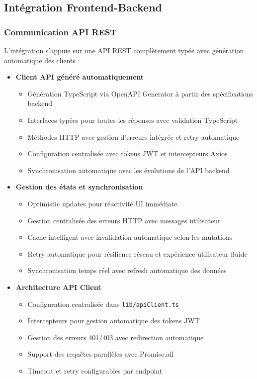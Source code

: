 \documentclass[12pt,a4paper]{report}
\begin{document}
\subsection{Intégration Frontend-Backend}

\subsubsection{Communication API REST}

L'intégration s'appuie sur une API REST complètement typée avec génération automatique des clients :

\begin{itemize}
\item \textbf{Client API généré automatiquement}
  \begin{itemize}

  \item Génération TypeScript via OpenAPI Generator à partir des spécifications backend
  \item Interfaces typées pour toutes les réponses avec validation TypeScript
  \item Méthodes HTTP avec gestion d'erreurs intégrée et retry automatique
  \item Configuration centralisée avec tokens JWT et intercepteurs Axios
  \item Synchronisation automatique avec les évolutions de l'API backend
  \end{itemize}

\item \textbf{Gestion des états et synchronisation}
  \begin{itemize}

  \item Optimistic updates pour réactivité UI immédiate
  \item Gestion centralisée des erreurs HTTP avec messages utilisateur
  \item Cache intelligent avec invalidation automatique selon les mutations
  \item Retry automatique pour résilience réseau et expérience utilisateur fluide
  \item Synchronisation temps réel avec refresh automatique des données
  \end{itemize}


\item \textbf{Architecture API Client}
  \begin{itemize}
  \item Configuration centralisée dans \texttt{lib/apiClient.ts}
  \item Intercepteurs pour gestion automatique des tokens JWT
  \item Gestion des erreurs 401/403 avec redirection automatique
  \item Support des requêtes parallèles avec Promise.all
  \item Timeout et retry configurables par endpoint
  \end{itemize}
\end{itemize}
\end{document}
